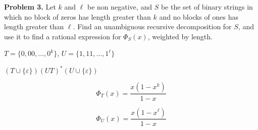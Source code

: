 \textbf{Problem 3.}
Let $ k $ and $ \ell $ be non negative, and $ S $ be the set of binary
strings in which no block of zeros has length greater than $ k $
and no blocks of ones has length greater than $ \ell $. Find
an unambiguous recursive decomposition for $ S $, and use it to find a rational
expression for $ \Phi_S(x) $, weighted by length.

$ T=\{0,00,\ldots ,0^k\} $, $ U=\{1,11,\ldots ,1^\ell\} $

$ (T \cup \{\varepsilon\})(UT)^*(U\cup \{\varepsilon\}) $

\[ \Phi_T(x)= \frac{x(1-x^{k})}{1-x} \]

\[ \Phi_U(x)=\frac{x(1-x^\ell)}{1-x} \]
